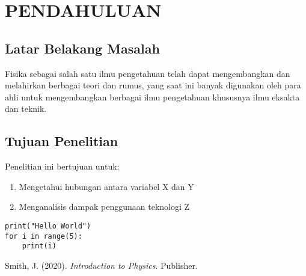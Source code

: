 \documentclass[a4paper,12pt]{report}
\newcommand{\titlepagekti}[4]{
  \begin{titlepage}
    \centering
    {\fontsize{17}{20}\bfseries #1\par}
    \vfill
    {\arial\fontsize{14}{16}\selectfont #2\par}
    {\arial\fontsize{14}{16}\selectfont #3\par}
    {\arial\fontsize{14}{16}\selectfont #4\par}
  \end{titlepage}
}
\begin{document}
\pagestyle{plain}


\tableofcontents

\cleardoublepage
\pagestyle{mainstyle}

\chapter{PENDAHULUAN}
\section{Latar Belakang Masalah}
Fisika sebagai salah satu ilmu pengetahuan telah dapat mengembangkan dan melahirkan berbagai teori dan rumus, yang saat ini banyak digunakan oleh para ahli untuk mengembangkan berbagai ilmu pengetahuan khususnya ilmu eksakta dan teknik.

\section{Tujuan Penelitian}
Penelitian ini bertujuan untuk:
\begin{enumerate}
  \item Mengetahui hubungan antara variabel X dan Y
  \item Menganalisis dampak penggunaan teknologi Z 
\end{enumerate}

\begin{lstlisting}[caption=Contoh Kode Program]
print("Hello World")
for i in range(5):
    print(i)
\end{lstlisting}
\pagebreak
\begin{thebibliography}{9}
\singlespacing
{} Smith, J. (2020). \textit{Introduction to Physics}. Publisher.
\end{thebibliography}
\end{document}
